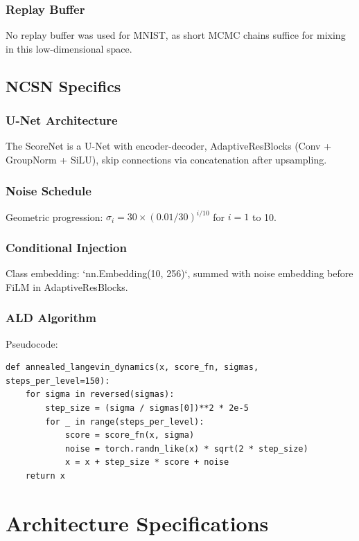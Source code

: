 \documentclass[a4paper,12pt]{article}
\begin{document}
\subsubsection{Replay Buffer}
No replay buffer was used for MNIST, as short MCMC chains suffice for mixing in this low-dimensional space.

\subsection{NCSN Specifics}
\subsubsection{U-Net Architecture}
The ScoreNet is a U-Net with encoder-decoder, AdaptiveResBlocks (Conv + GroupNorm + SiLU), skip connections via concatenation after upsampling.

\subsubsection{Noise Schedule}
Geometric progression: $\sigma_i = 30 \times (0.01 / 30)^{i/10}$ for $i=1$ to 10.

\subsubsection{Conditional Injection}
Class embedding: `nn.Embedding(10, 256)`, summed with noise embedding before FiLM in AdaptiveResBlocks.

\subsubsection{ALD Algorithm}
Pseudocode:
\begin{verbatim}
def annealed_langevin_dynamics(x, score_fn, sigmas, steps_per_level=150):
    for sigma in reversed(sigmas):
        step_size = (sigma / sigmas[0])**2 * 2e-5
        for _ in range(steps_per_level):
            score = score_fn(x, sigma)
            noise = torch.randn_like(x) * sqrt(2 * step_size)
            x = x + step_size * score + noise
    return x
\end{verbatim}

\section{Architecture Specifications}
\end{document}
